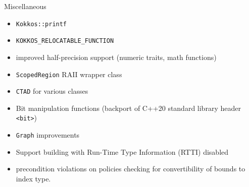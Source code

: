 \begin{frame}[fragile]{Miscellaneous}
  \begin{itemize}
    \item \texttt{Kokkos::printf}
    \item \texttt{KOKKOS\_RELOCATABLE\_FUNCTION}
    \item improved half-precision support (numeric traits, math functions)
    \item \texttt{ScopedRegion} RAII wrapper class
    \item \texttt{CTAD} for various classes
    \item Bit manipulation functions (backport of C++20 standard library header \texttt{<bit>})
    \item \texttt{Graph} improvements
    \item Support building with Run-Time Type Information (RTTI) disabled
    \item precondition violations on policies checking for convertibility of bounds to index type.
\end{itemize}
\end{frame}
